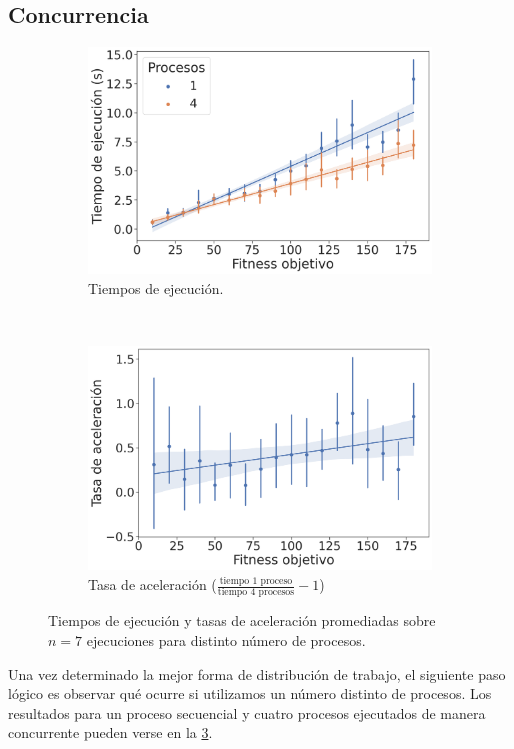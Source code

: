 \documentclass[twocolumn,spanish]{revtex4-1}
\begin{document}
\subsection{Concurrencia}
\begin{figure}[ht]
\centering
    \begin{subfigure}{\linewidth}
        \centering
        \includegraphics[width=0.9\linewidth]{eval_procesos.png}
        \caption{Tiempos de ejecución.}
        \label{fig:eval_procesos}
    \end{subfigure}%
    ~\\\vspace{12pt}
    \begin{subfigure}{\linewidth}
        \centering
        \includegraphics[width=0.9\linewidth]{acel_procesos.png}
        \caption{Tasa de aceleración ($\frac{\text{tiempo 1 proceso}}{\text{tiempo 4 procesos}}-1$)}
        \label{fig:acel_procesos}
    \end{subfigure}%
    \caption{Tiempos de ejecución y tasas de aceleración promediadas sobre $n=7$ ejecuciones para distinto número de procesos.}
    \label{procesos}
\end{figure}
Una vez determinado la mejor forma de distribución de trabajo, el siguiente paso lógico es observar qué ocurre si utilizamos un número distinto de procesos. Los resultados para un proceso secuencial y cuatro procesos ejecutados de manera concurrente pueden verse en la \cref{procesos}. 
\end{document}
